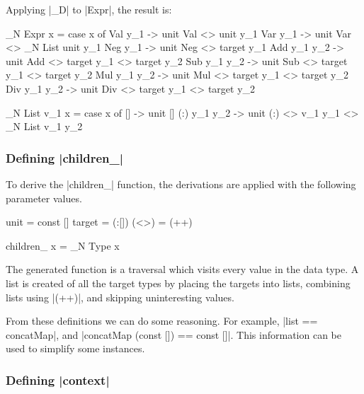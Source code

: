 Applying |_D| to |Expr|, the result is:

\begin{code}
_N \< Expr \> \? x = case x of
    Val  y_1      -> unit Val  <> unit y_1
    Var  y_1      -> unit Var  <> _N \< List \> \? unit y_1
    Neg  y_1      -> unit Neg  <> target y_1
    Add  y_1 y_2  -> unit Add  <> target y_1 <> target y_2
    Sub  y_1 y_2  -> unit Sub  <> target y_1 <> target y_2
    Mul  y_1 y_2  -> unit Mul  <> target y_1 <> target y_2
    Div  y_1 y_2  -> unit Div  <> target y_1 <> target y_2

_N \< List \> \? v_1 x = case x of
    []            -> unit []
    (:)  y_1 y_2  -> unit (:) <> v_1 y_1 <> _N \< List \> \? v_1 y_2
\end{code}

\begin{comment}
To generate a particular operation we can replace the |unit|, |target| and |<>| functions with versions specific to that operation. We do this replacement using multiple copies of the template, introducing |where| clauses with local definitions of the three functions.
\end{comment}

\subsubsection{Defining |children_|}

To derive the |children_| function, the derivations are applied with the following parameter values.

\begin{code}
unit    = const []
target  = (:[])
(<>)    = (++)

children_ x = _N \< Type \> \? x
\end{code}

The generated function is a traversal which visits every value in the data type. A list is created of all the target types by placing the targets into lists, combining lists using |(++)|, and skipping uninteresting values.

From these definitions we can do some reasoning. For example, |list == concatMap|, and |concatMap (const []) == const []|. This information can be used to simplify some instances.

\subsubsection{Defining |context|}

